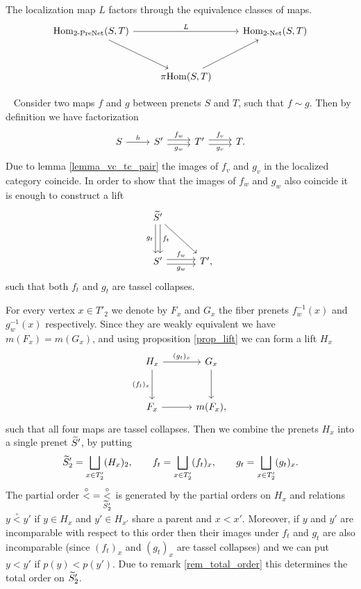\documentclass[letterpaper,12pt,leqno]{article}
\numberwithin{equation}{theorem}
\def\Net{\textrm{-}\mathrm{Net}}
\def\PreNet{\textrm{-}\mathrm{PreNet}}
\def\proof{\noindent{\em Proof:}\ }
\def\lesub{\mathop{<}\limits}
\def\pless{\lesub^\circ}
\begin{document}
\begin{lemma}
\label{lemma_loc_pi}
The localization map $L$ factors through the equivalence classes of maps.
$$
\begin{tikzcd}[row sep=3em]
\Hom_{2\PreNet}(S, T) \ar[dr] \ar[rr, "L"] && \Hom_{2\Net}(S, T) \\
& \pi\Hom(S, T) \ar[ur]
\end{tikzcd}
$$
\end{lemma}
\proof
Consider two maps $f$ and $g$ between prenets $S$ and $T$, such that $f \sim g$. Then by definition we have factorization
$$
\begin{tikzcd}
S \ar[r, "h"] & S' \ar[shift left, r, "f_w"] \ar[shift right, r, "g_w"'] & T' \ar[shift left, r, "f_v"] \ar[shift right, r, "g_v"'] & T.
\end{tikzcd}
$$
Due to lemma \ref{lemma_vc_tc_pair} the images of $f_v$ and $g_v$ in the localized category coincide. In order to show that the images
of $f_w$ and $g_w$ also coincide it is enough to construct a lift
$$
\begin{tikzcd}[sep=3em]
\wtilde S' \ar[shift left, d, "f_t"] \ar[shift right, d, "g_t"'] \ar[dr] & \\
S' \ar[shift left, r, "f_w"] \ar[shift right, r, "g_w"'] & T',
\end{tikzcd}
$$
such that both $f_t$ and $g_t$ are tassel collapses.

For every vertex $x \in T'_2$ we denote by $F_x$ and $G_x$ the fiber prenets $f_w^{-1}(x)$ and $g_w^{-1}(x)$ respectively. Since they are weakly equivalent
we have $m(F_x) = m(G_x)$, and using proposition \ref{prop_lift} we can form a lift $H_x$
$$
\begin{tikzcd}[sep=3em]
H_x \ar[r, "(g_t)_x"] \ar[d, "(f_t)_x"'] & G_x \ar[d] \\
F_x \ar[r] & m(F_x),
\end{tikzcd}
$$
such that all four maps are tassel collapses. Then we combine the prenets $H_x$ into a single prenet $\widetilde S'$, by putting
$$
\widetilde S'_2 = \bigsqcup_{x \in T'_2} (H_x)_2, \quad\quad f_t = \bigsqcup_{x \in T'_2} (f_t)_x, \quad\quad g_t = \bigsqcup_{x \in T'_2} (g_t)_x.
$$
The partial order $\pless = \pless_{\wtilde S'_2}$ is generated by the partial orders on $H_x$ and relations $y \pless y'$ if $y \in H_x$ and $y' \in H_{x'}$ share a parent and
$x < x'$. Moreover, if $y$ and $y'$ are incomparable with respect to this order then their images under $f_t$ and $g_t$ are also incomparable (since $(f_t)_x$ and $(g_t)_x$ are tassel collapses)
and we can put $y < y'$ if $p(y) < p(y')$. Due to remark \ref{rem_total_order} this determines the total order on $\widetilde S'_2$.
\end{document}
